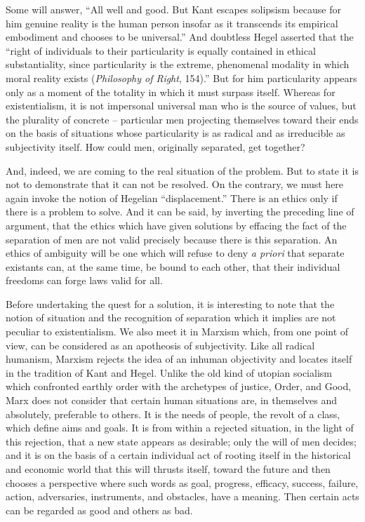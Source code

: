 \documentclass[11pt]{article}
\begin{document}
Some will answer, “All well and good. But Kant escapes solipsism because for him genuine reality is the human person insofar as it transcends its empirical embodiment and chooses to be universal.” And doubtless Hegel asserted that the “right of individuals to their particularity is equally contained in ethical substantiality, since particularity is the extreme, phenomenal modality in which moral reality exists (\textit{Philosophy of Right}, 154).” But for him particularity appears only as a moment of the totality in which it must surpass itself. Whereas for existentialism, it is not impersonal universal man who is the source of values, but the plurality of concrete – particular men projecting themselves toward their ends on the basis of situations whose particularity is as radical and as irreducible as subjectivity itself. How could men, originally separated, get together?

And, indeed, we are coming to the real situation of the problem. But to state it is not to demonstrate that it can not be resolved. On the contrary, we must here again invoke the notion of Hegelian “displacement.” There is an ethics only if there is a problem to solve. And it can be said, by inverting the preceding line of argument, that the ethics which have given solutions by effacing the fact of the separation of men are not valid precisely because there is this separation. An ethics of ambiguity will be one which will refuse to deny \textit{a priori} that separate existants can, at the same time, be bound to each other, that their individual freedoms can forge laws valid for all.

Before undertaking the quest for a solution, it is interesting to note that the notion of situation and the recognition of separation which it implies are not peculiar to existentialism. We also meet it in Marxism which, from one point of view, can be considered as an apotheosis of subjectivity. Like all radical humanism, Marxism rejects the idea of an inhuman objectivity and locates itself in the tradition of Kant and Hegel. Unlike the old kind of utopian socialism which confronted earthly order with the archetypes of justice, Order, and Good, Marx does not consider that certain human situations are, in themselves and absolutely, preferable to others. It is the needs of people, the revolt of a class, which define aims and goals. It is from within a rejected situation, in the light of this rejection, that a new state appears as desirable; only the will of men decides; and it is on the basis of a certain individual act of rooting itself in the historical and economic world that this will thrusts itself, toward the future and then chooses a perspective where such words as goal, progress, efficacy, success, failure, action, adversaries, instruments, and obstacles, have a meaning. Then certain acts can be regarded as good and others as bad.
\end{document}
